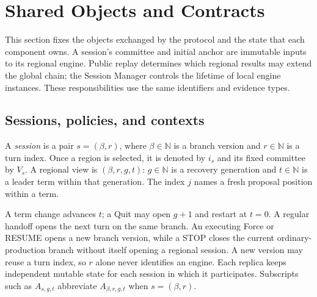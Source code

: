 \section{Shared Objects and Contracts}
\label{sec:shared-objects}

This section fixes the objects exchanged by the protocol and the state
that each component owns. A session's committee and initial anchor are
immutable inputs to its regional engine. Public replay determines which
regional results may extend the global chain; the Session Manager
controls the lifetime of local engine instances. These responsibilities
use the same identifiers and evidence types.

\subsection{Sessions, policies, and contexts}
\label{sec:objects-context}

\begin{definition}
\label{def:session-view}
A \emph{session} is a pair $s=(\beta,r)$, where $\beta\in\mathbb N$ is a
branch version and $r\in\mathbb N$ is a turn index. Once a region is
selected, it is denoted by $i_s$ and its fixed committee by $V_s$.
A regional view is
$(\beta,r,g,t)$: $g\in\mathbb N$ is a recovery generation and
$t\in\mathbb N$ is a leader term within that generation. The index $j$
names a fresh proposal position within a term.
\end{definition}
A term change advances $t$; a Quit may open $g+1$ and restart at $t=0$.
A regular handoff opens the next turn on the same branch. An executing
Force or RESUME opens a new branch version, while a STOP closes the
current ordinary-production branch without itself opening a regional
session. A new version may reuse a turn index, so $r$ alone never
identifies an engine. Each replica keeps independent mutable state for
each session in which it participates.
Subscripts such as $A_{s,g,t}$ abbreviate $A_{\beta,r,g,t}$ when
$s=(\beta,r)$.


